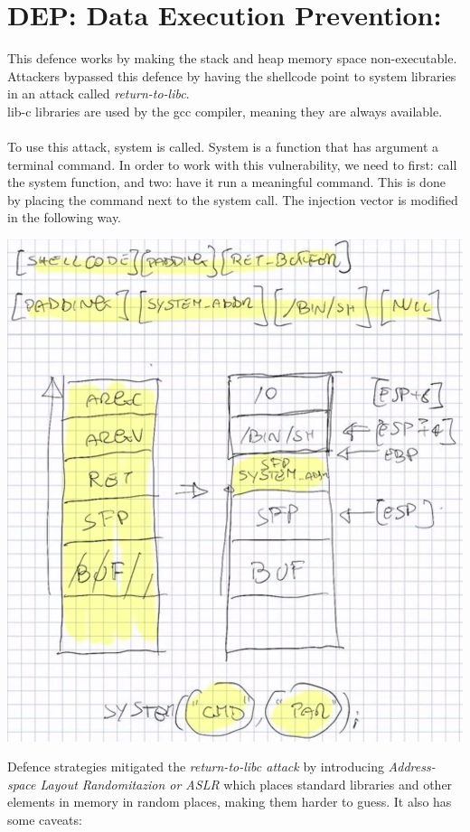 \documentclass[11pt, oneside]{article}   	%
\begin{document}
\section*{DEP: Data Execution Prevention:}
This defence works by making the stack and heap memory space non-executable. Attackers bypassed this defence by having the shellcode point to system libraries in an attack called \emph{return-to-libc}.\\ lib-c libraries are used by the gcc compiler, meaning they are always available.\\\\
To use this attack, system is called. System is a function that has argument a terminal command. In order to work with this vulnerability, we need to first: call the system function, and two: have it run a meaningful command. This is done by placing the command next to the system call. The injection vector is modified in the following way.
\begin{center}
\includegraphics[scale = 0.5]{libc}
\end{center}
Defence strategies mitigated the \emph{return-to-libc attack} by introducing \emph{Address-space Layout Randomitazion or ASLR} which places standard libraries and other elements in memory in random places, making them harder to guess. It also has some caveats:
\end{document}
